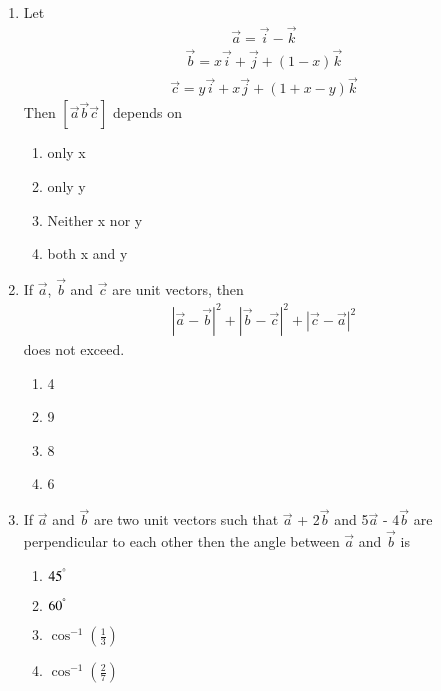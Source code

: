 \begin{enumerate}[label=\arabic*.,ref=\thesubsection.\theenumi]
\item Let 
\begin{align*}
\overrightarrow{a} = \overrightarrow{i} - \overrightarrow{k}
\end{align*}
\begin{align*}
\overrightarrow{b} = x\overrightarrow{i} + \overrightarrow{j} + (1 - x)\overrightarrow{k}
\end{align*}
\begin{align*}
\overrightarrow{c} = y\overrightarrow{i} + x\overrightarrow{j} + (1 + x -y)\overrightarrow{k}
\end{align*}
Then $[\overrightarrow{a}\overrightarrow{b}\overrightarrow{c}]$ depends on
\begin{enumerate}
\item only x
\item only y
\item Neither x nor y
\item both x and y
\end{enumerate}

\item If $\overrightarrow{a}$, $\overrightarrow{b}$ and $\overrightarrow{c}$ are unit vectors, then 
\begin{align*}
|\overrightarrow{a} - \overrightarrow{b}|^{2} + |\overrightarrow{b} - \overrightarrow{c}|^{2} + |\overrightarrow{c} - \overrightarrow{a}|^{2}
\end{align*}
does not exceed.
\begin{enumerate}
\item 4
\item 9
\item 8
\item 6
\end{enumerate}

\item If $\overrightarrow{a}$ and $\overrightarrow{b}$ are two unit vectors such that $\overrightarrow{a}$ + 2$\overrightarrow{b}$ and 5$\overrightarrow{a}$ - 4$\overrightarrow{b}$ are perpendicular to each other then the angle between $\overrightarrow{a}$ and $\overrightarrow{b}$ is
\begin{enumerate}
\item $45^{\degree}$
\item $60^{\degree}$
\item $\cos^{-1}(\frac{1}{3})$
\item $\cos^{-1}(\frac{2}{7})$
\end{enumerate}


\end{enumerate}
